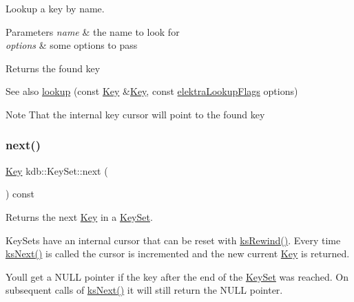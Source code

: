 Lookup a key by name. 


\begin{DoxyParams}{Parameters}
{\em name} & the name to look for \\
\hline
{\em options} & some options to pass\\
\hline
\end{DoxyParams}
\begin{DoxyReturn}{Returns}
the found key 
\end{DoxyReturn}
\begin{DoxySeeAlso}{See also}
\hyperlink{classkdb_1_1KeySet_a2b8537e388edfbb6941d771106c0ae3a}{lookup} (const \hyperlink{classkdb_1_1Key}{Key} \&\hyperlink{group__key}{Key}, const \hyperlink{group__keyset_gada05f4bbf46fde81d0d57df86e73d914}{elektra\+Lookup\+Flags} options)
\end{DoxySeeAlso}
\begin{DoxyNote}{Note}
That the internal key cursor will point to the found key 
\end{DoxyNote}
\mbox{\label{classkdb_1_1KeySet_affd52d130faf184361297f9e7f0c9f16}} 
\subsubsection{\texorpdfstring{next()}{next()}}
{\footnotesize\ttfamily \hyperlink{classkdb_1_1Key}{Key} kdb\+::\+Key\+Set\+::next (\begin{DoxyParamCaption}{ }\end{DoxyParamCaption}) const\hspace{0.3cm}{\ttfamily [inline]}}



Returns the next \hyperlink{classkdb_1_1Key}{Key} in a \hyperlink{classkdb_1_1KeySet}{Key\+Set}. 

Key\+Sets have an internal cursor that can be reset with \hyperlink{group__keyset_gabe793ff51f1728e3429c84a8a9086b70}{ks\+Rewind()}. Every time \hyperlink{group__keyset_ga317321c9065b5a4b3e33fe1c399bcec9}{ks\+Next()} is called the cursor is incremented and the new current \hyperlink{classkdb_1_1Key}{Key} is returned.

You\textquotesingle{}ll get a N\+U\+LL pointer if the key after the end of the \hyperlink{classkdb_1_1KeySet}{Key\+Set} was reached. On subsequent calls of \hyperlink{group__keyset_ga317321c9065b5a4b3e33fe1c399bcec9}{ks\+Next()} it will still return the N\+U\+LL pointer.

